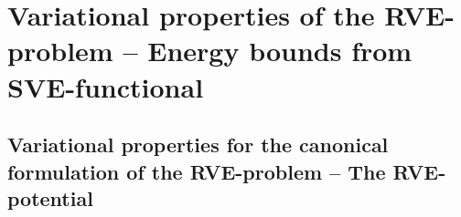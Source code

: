 \documentclass[12pt,a4paper]{article}
\renewcommand{\ta}[1]{\mathbfit{#1}}
\renewcommand{\ts}[1]{\mathbfit{#1}}
\renewcommand{\Box}{\mdlgwhtsquare}
\newcommand{\rve}{
  {\mathchoice
   {\mbox{\scalebox{0.67}{$\Box$}}}
   {\mbox{\scalebox{0.67}{$\Box$}}}
   {\mbox{\scalebox{0.5}{$\Box$}}}
   {\mbox{\scalebox{0.375}{$\Box$}}}
  }
}
\begin{document}
%
%
%


\section{Variational properties of the RVE-problem -- Energy bounds from SVE-functional}

\subsection{Variational properties for the canonical formulation of the RVE-problem -- The RVE-potential}
\end{document}
